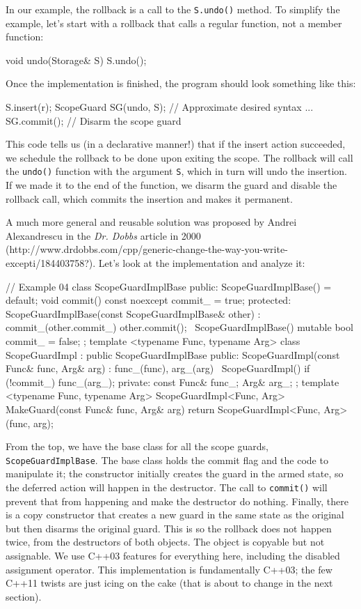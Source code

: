 In our example, the rollback is a call to the \texttt{S.undo()} method. To simplify the example, let's start with a rollback that calls a regular function, not a member function:

\begin{code}
void undo(Storage& S) { S.undo(); }
\end{code}

Once the implementation is finished, the program should look something like this:

\begin{code}
{
  S.insert(r);
  ScopeGuard SG(undo, S);    // Approximate desired syntax
  ...
  SG.commit();            // Disarm the scope guard
}
\end{code}

This code tells us (in a declarative manner!) that if the insert action succeeded, we schedule the rollback to be done upon exiting the scope. The rollback will call the \texttt{undo()} function with the argument \texttt{S}, which in turn will undo the insertion. If we made it to the end of the function, we disarm the guard and disable the rollback call, which commits the insertion and makes it permanent.

A much more general and reusable solution was proposed by Andrei Alexandrescu in the \emph{Dr. Dobbs} article in 2000 (http://www.drdobbs.com/cpp/generic-change-the-way-you-write-excepti/184403758?). Let's look at the implementation and analyze it:

\begin{code}
// Example 04
class ScopeGuardImplBase {
  public:
  ScopeGuardImplBase() = default;
  void commit() const noexcept { commit_ = true; }
  protected:
  ScopeGuardImplBase(const ScopeGuardImplBase& other) :
    commit_(other.commit_) { other.commit(); }
  ~ScopeGuardImplBase() {}
  mutable bool commit_ = false;
};
template <typename Func, typename Arg>
class ScopeGuardImpl : public ScopeGuardImplBase {
  public:
  ScopeGuardImpl(const Func& func, Arg& arg) :
    func_(func), arg_(arg) {}
  ~ScopeGuardImpl() { if (!commit_) func_(arg_); }
  private:
  const Func& func_;
  Arg& arg_;
};
template <typename Func, typename Arg>
ScopeGuardImpl<Func, Arg>
MakeGuard(const Func& func, Arg& arg) {
  return ScopeGuardImpl<Func, Arg>(func, arg);
}
\end{code}

From the top, we have the base class for all the scope guards, \texttt{ScopeGuardImplBase}. The base class holds the commit flag and the code to manipulate it; the constructor initially creates the guard in the armed state, so the deferred action will happen in the destructor. The call to \texttt{commit()} will prevent that from happening and make the destructor do nothing. Finally, there is a copy constructor that creates a new guard in the same state as the original but then disarms the original guard. This is so the rollback does not happen twice, from the destructors of both objects. The object is copyable but not assignable. We use C++03 features for everything here, including the disabled assignment operator. This implementation is fundamentally C++03; the few C++11 twists are just icing on the cake (that is about to change in the next section).

